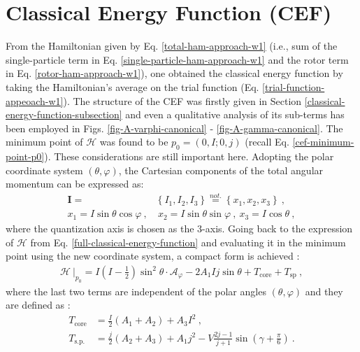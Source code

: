 \section{Classical Energy Function (CEF)}

From the Hamiltonian given by Eq. \ref{total-ham-approach-w1} (i.e., sum of the single-particle term in Eq. \ref{single-particle-ham-approach-w1} and the rotor term in Eq. \ref{rotor-ham-approach-w1}), one obtained the classical energy function by taking the Hamiltonian's average on the trial function (Eq. \ref{trial-function-appeoach-w1}). The structure of the CEF was firstly given in Section \ref{classical-energy-function-subsection} and even a qualitative analysis of its sub-terms has been employed in Figs. \ref{fig-A-varphi-canonical} - \ref{fig-A-gamma-canonical}. The minimum point of $\mathcal{H}$ was found to be $p_0=(0,I;0,j)$ (recall Eq. \ref{cef-minimum-point-p0}). These considerations are still important here. Adopting the polar coordinate system $(\theta,\varphi)$, the Cartesian components of the total angular momentum can be expressed as:
\begin{align}
    \mathbf{I}=&\left\{I_1,I_2,I_3\right\}\stackrel{not.}{=}\left\{x_1,x_2,x_3\right\}\ ,\nonumber\\
    x_1=I\sin\theta\cos\varphi\ ,&\ x_2=I\sin\theta\sin\varphi\ ,\ x_3=I\cos\theta\ ,
    \label{polar-coordinates-total-AM}
\end{align}
where the quantization axis is chosen as the $3$-axis. Going back to the expression of $\mathcal{H}$ from Eq. \ref{full-classical-energy-function} and evaluating it in the minimum point using the new coordinate system, a compact form is achieved \cite{poenaru2021extensive2}:
\begin{align}
    \left. \mathcal{H}\ \right\vert_{p_0}=I\left(I-\frac{1}{2}\right)\sin^2\theta\cdot \mathcal{A}_\varphi-2A_1Ij\sin\theta+T_\text{core}+T_\text{sp}\ ,
    \label{CEF-minimum-point-Tcore-Tsp}
\end{align}
where the last two terms are independent of the polar angles $(\theta,\varphi)$ and they are defined as \cite{poenaru2021extensive2}:
\begin{align}
    T_\text{core}&=\frac{I}{2}(A_1+A_2)+A_3I^2\ ,\\
    T_\text{s.p.}&=\frac{j}{2}(A_2+A_3)+A_1j^2-V\frac{2j-1}{j+1}\sin\left(\gamma+\frac{\pi}{6}\right)\ .
    \label{core-sp-sub-terms}
\end{align}

